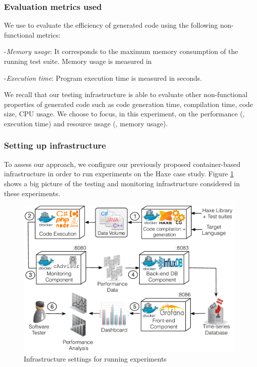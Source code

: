 \subsubsection{Evaluation metrics used}
We use to evaluate the efficiency of generated code using the following non-functional metrics:

-\textit{Memory usage}:
It corresponds to the maximum memory consumption of the running test suite. Memory usage is measured in \SI{}{\mega\byte}

-\textit{Execution time}:
Program execution time is measured in seconds.

We recall that our testing infrastructure is able to evaluate other non-functional properties of generated code such as code generation time, compilation time, code size, CPU usage. We choose to focus, in this experiment, on the performance (\ie, execution time) and resource usage (\ie, memory usage).

\subsubsection{Setting up infrastructure}

To assess our approach, we configure our previously proposed container-based infrastructure in order to run experiments on the Haxe case study.
Figure \ref{fig:settingup.pdf} shows a big picture of the testing and monitoring infrastructure considered in these experiments.

\begin{figure}[h]
	\centering
	\includegraphics[width=0.8\linewidth]{chapitre4/fig/settingup.pdf}
	\caption{Infrastructure settings for running experiments}
	\label{fig:settingup.pdf}
\end{figure}

